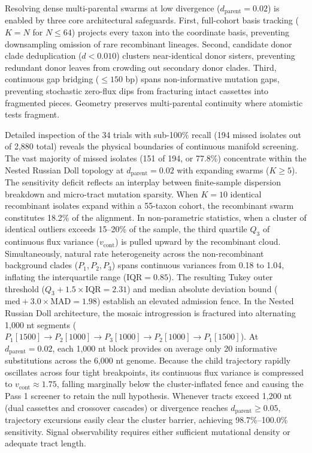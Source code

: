 Resolving dense multi-parental swarms at low divergence ($d_{\text{parent}} = 0.02$) is enabled by three core architectural safeguards.
First, full-cohort basis tracking ($K = N$ for $N \le 64$) projects every taxon into the coordinate basis, preventing downsampling omission of rare recombinant lineages.
Second, candidate donor clade deduplication ($d < 0.010$) clusters near-identical donor sisters, preventing redundant donor leaves from crowding out secondary donor clades.
Third, continuous gap bridging ($\le 150$ bp) spans non-informative mutation gaps, preventing stochastic zero-flux dips from fracturing intact cassettes into fragmented pieces.
Geometry preserves multi-parental continuity where atomistic tests fragment.

Detailed inspection of the 34 trials with sub-100\% recall (194 missed isolates out of 2,880 total) reveals the physical boundaries of continuous manifold screening.
The vast majority of missed isolates (151 of 194, or 77.8\%) concentrate within the Nested Russian Doll topology at $d_{\text{parent}} = 0.02$ with expanding swarms ($K \ge 5$).
The sensitivity deficit reflects an interplay between finite-sample dispersion breakdown and micro-tract mutation sparsity.
When $K = 10$ identical recombinant isolates expand within a 55-taxon cohort, the recombinant swarm constitutes 18.2\% of the alignment.
In non-parametric statistics, when a cluster of identical outliers exceeds 15--20\% of the sample, the third quartile $Q_3$ of continuous flux variance ($v_{\text{cont}}$) is pulled upward by the recombinant cloud.
Simultaneously, natural rate heterogeneity across the non-recombinant background clades ($P_1, P_2, P_3$) spans continuous variances from 0.18 to 1.04, inflating the interquartile range ($\text{IQR} = 0.85$).
The resulting Tukey outer threshold ($Q_3 + 1.5 \times \text{IQR} = 2.31$) and median absolute deviation bound ($\text{med} + 3.0 \times \text{MAD} = 1.98$) establish an elevated admission fence.
In the Nested Russian Doll architecture, the mosaic introgression is fractured into alternating 1,000 nt segments ($P_1 [1500] \to P_2 [1000] \to P_3 [1000] \to P_2 [1000] \to P_1 [1500]$).
At $d_{\text{parent}} = 0.02$, each 1,000 nt block provides on average only 20 informative substitutions across the 6,000 nt genome.
Because the child trajectory rapidly oscillates across four tight breakpoints, its continuous flux variance is compressed to $v_{\text{cont}} \approx 1.75$, falling marginally below the cluster-inflated fence and causing the Pass 1 screener to retain the null hypothesis.
Whenever tracts exceed 1,200 nt (dual cassettes and crossover cascades) or divergence reaches $d_{\text{parent}} \ge 0.05$, trajectory excursions easily clear the cluster barrier, achieving 98.7\%--100.0\% sensitivity.
Signal observability requires either sufficient mutational density or adequate tract length.

